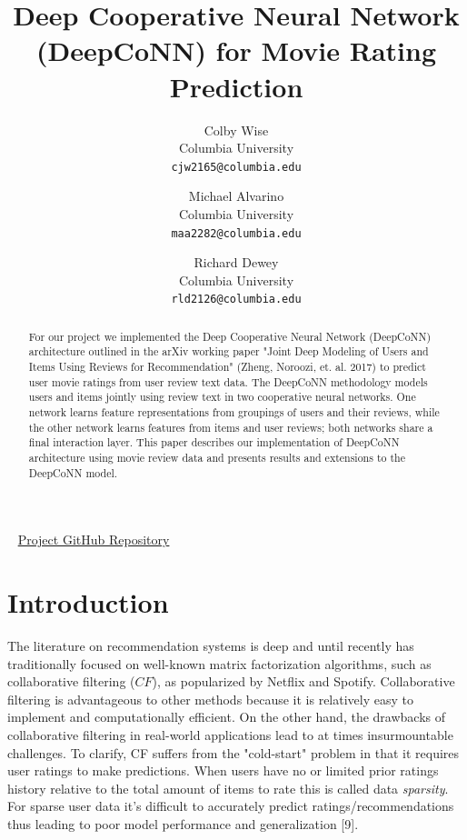 \documentclass[10pt,twocolumn,letterpaper]{article}
\begin{document}
\title{Deep Cooperative Neural Network (DeepCoNN) for Movie Rating Prediction}

\author{Colby Wise\\
Columbia University\\
{\tt\small cjw2165@columbia.edu}
\and
Michael Alvarino\\
Columbia University\\
{\tt\small maa2282@columbia.edu}
\and
Richard Dewey\\
Columbia University\\
{\tt\small rld2126@columbia.edu}
}

\maketitle

\begin{abstract}
For our project we implemented the Deep Cooperative Neural Network (DeepCoNN) architecture outlined in the arXiv working paper "Joint Deep Modeling of Users and Items Using Reviews for Recommendation" (Zheng, Noroozi, et. al. 2017) to predict user movie ratings from user review text data. The DeepCoNN methodology models users and items jointly using review text in two cooperative neural networks. One network learns feature representations from groupings of users and their reviews, while the other network learns features from items and user reviews; both networks share a final interaction layer. This paper describes our implementation of DeepCoNN architecture using movie review data and presents results and extensions to the DeepCoNN model.
\end{abstract}
\ \newline
\href{https://github.com/michaelAlvarino/Deep-Learning}{Project GitHub Repository}

\section{Introduction}

\par The literature on recommendation systems is deep and until recently has traditionally focused on well-known matrix factorization algorithms, such as collaborative filtering ($CF$), as popularized by Netflix and Spotify. Collaborative filtering is advantageous to other methods because it is relatively easy to implement and computationally efficient. On the other hand, the drawbacks of collaborative filtering in real-world applications lead to at times insurmountable challenges. To clarify, CF suffers from the "cold-start" problem in that it requires user ratings to make predictions. When users have no or limited prior ratings history relative to the total amount of items to rate this is called data \textit{sparsity}. For sparse user data it's difficult to accurately predict ratings/recommendations thus leading to poor model performance and generalization [9]. 
\end{document}
